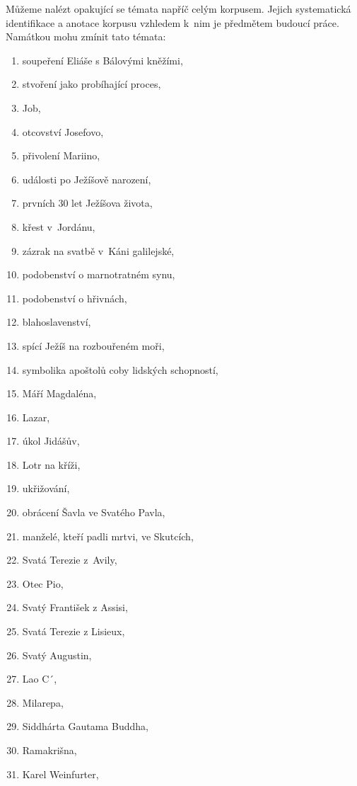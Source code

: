 Můžeme nalézt opakující se témata napříč celým korpusem. Jejich systematická
identifikace a anotace korpusu vzhledem k~nim je předmětem budoucí práce.
Namátkou mohu zmínit tato témata:

\begin{enumerate}
\item{soupeření Eliáše s Bálovými kněžími,}
\item{stvoření jako probíhající proces,}
\item{Job,}

\item{otcovství Josefovo,}
\item{přivolení Mariino,}
\item{události po Ježíšově narození,}
\item{prvních 30 let Ježíšova života,}
\item{křest v~Jordánu,}
\item{zázrak na svatbě v~Káni galilejské,}
\item{podobenství o marnotratném synu,}
\item{podobenství o hřivnách,}
\item{blahoslavenství,}
\item{spící Ježíš na rozbouřeném moři,}
\item{symbolika apoštolů coby lidských schopností,}
\item{Máří Magdaléna,}
\item{Lazar,}
\item{úkol Jidášův,}
\item{Lotr na kříži,}
\item{ukřižování,}

\item{obrácení Šavla ve Svatého Pavla,}
\item{manželé, kteří padli mrtvi, ve Skutcích,}

\item{Svatá Terezie z~Avily,}
\item{Otec Pio,}
\item{Svatý František z Assisi,}
\item{Svatá Terezie z Lisieux,}
\item{Svatý Augustin,}

\item{Lao C´,}
\item{Milarepa,}
\item{Siddhárta Gautama Buddha,}
\item{Ramakrišna,}
\item{Karel Weinfurter,}


\end{enumerate}
